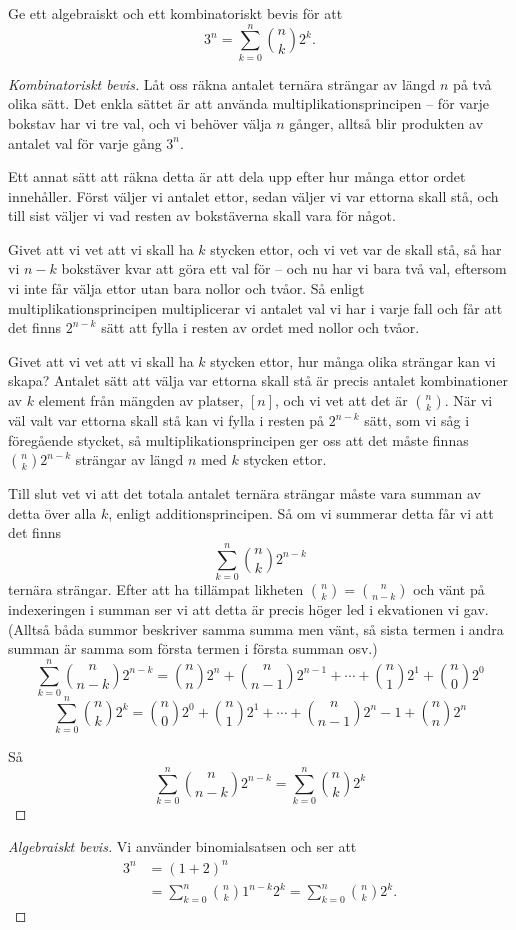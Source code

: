 \documentclass[nobib]{tufte-handout}
\begin{document}
\begin{example}
  Ge ett algebraiskt och ett kombinatoriskt bevis för att
  $$3^n = \sum_{k=0}^n \binom{n}{k}2^k.$$

  \begin{proof}[Kombinatoriskt bevis]
    Låt oss räkna antalet ternära strängar av längd $n$ på två olika sätt. Det enkla sättet är att använda multiplikationsprincipen -- för varje bokstav har vi tre val, och vi behöver välja $n$ gånger, alltså blir produkten av antalet val för varje gång $3^n$.

    Ett annat sätt att räkna detta är att dela upp efter hur många ettor ordet innehåller. Först väljer vi antalet ettor, sedan väljer vi var ettorna skall stå, och till sist väljer vi vad resten av bokstäverna skall vara för något.

    Givet att vi vet att vi skall ha $k$ stycken ettor, och vi vet var de skall stå, så har vi $n-k$ bokstäver kvar att göra ett val för -- och nu har vi bara två val, eftersom vi inte får välja ettor utan bara nollor och tvåor. Så enligt multiplikationsprincipen multiplicerar vi antalet val vi har i varje fall och får att det finns $2^{n-k}$ sätt att fylla i resten av ordet med nollor och tvåor.

    Givet att vi vet att vi skall ha $k$ stycken ettor, hur många olika strängar kan vi skapa? Antalet sätt att välja var ettorna skall stå är precis antalet kombinationer av $k$ element från mängden av platser, $[n]$, och vi vet att det är $\binom{n}{k}$. När vi väl valt var ettorna skall stå kan vi fylla i resten på $2^{n-k}$ sätt, som vi såg i föregående stycket, så multiplikationsprincipen ger oss att det måste finnas $\binom{n}{k}2^{n-k}$ strängar av längd $n$ med $k$ stycken ettor.

    Till slut vet vi att det totala antalet ternära strängar måste vara summan av detta över alla $k$, enligt additionsprincipen. Så om vi summerar detta får vi att det finns
    $$\sum_{k=0}^n \binom{n}{k}2^{n-k}$$
    ternära strängar. Efter att ha tillämpat likheten $\binom{n}{k} = \binom{n}{n-k}$ och vänt på indexeringen i summan ser vi att detta är precis höger led i ekvationen vi gav. (Alltså båda summor beskriver samma summa men vänt, så sista termen i andra summan är samma som första termen i första summan osv.)
        $$\sum_{k=0}^n \binom{n}{n-k}2^{n-k}=\binom{n}{n}2^n+\binom{n}{n-1}2^{n-1}+\cdots+\binom{n}{1}2^1+\binom{n}{0}2^0$$
    $$\sum_{k=0}^n \binom{n}{k}2^k=\binom{n}{0}2^0+\binom{n}{1}2^{1}+\cdots+\binom{n}{n-1}2^n-1+\binom{n}{n}2^n$$

    Så 
    $$\sum_{k=0}^n \binom{n}{n-k}2^{n-k}=\sum_{k=0}^n \binom{n}{k}2^k$$
  \end{proof}

  \begin{proof}[Algebraiskt bevis]
    Vi använder binomialsatsen och ser att
    \begin{align*}
      3^n &= (1+2)^n\\
      &= \sum_{k=0}^n \binom{n}{k}1^{n-k}2^k = \sum_{k=0}^n \binom{n}{k}2^k.
    \end{align*}
  \end{proof}
\end{example}
\end{document}
